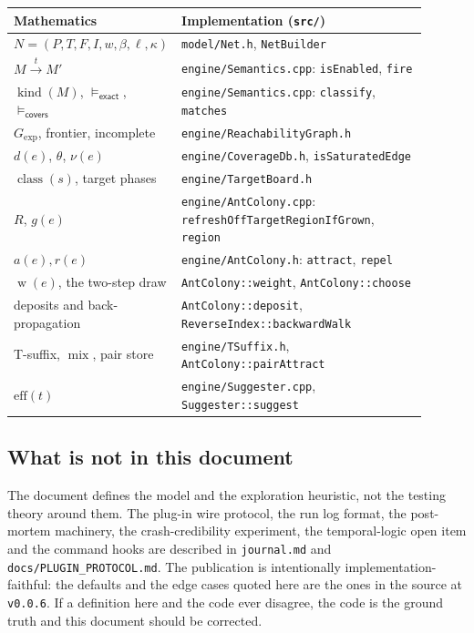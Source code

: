 \documentclass[11pt,a4paper]{article}
\newcommand{\Off}{R}
\newcommand{\kind}{\operatorname{kind}}
\newcommand{\cls}{\operatorname{class}}
\newcommand{\mix}{\operatorname{mix}}
\newcommand{\wgt}{\operatorname{w}}
\newcommand{\fir}[1]{\xrightarrow{#1}}
\begin{document}
\begin{center}
\small
\begin{tabular}{@{}p{0.28\linewidth}p{0.62\linewidth}@{}}
\toprule
Mathematics & Implementation (\texttt{src/}) \\
\midrule
$N=(P,T,F,I,w,\beta,\ell,\kappa)$ & \texttt{model/Net.h}, \texttt{NetBuilder} \\
$M\fir{t}M'$ & \texttt{engine/Semantics.cpp}: \texttt{isEnabled}, \texttt{fire} \\
$\kind(M)$, $\models_{\mathsf{exact}}$, $\models_{\mathsf{covers}}$ &
\texttt{engine/Semantics.cpp}: \texttt{classify}, \texttt{matches} \\
$G_{\mathrm{exp}}$, frontier, incomplete &
\texttt{engine/ReachabilityGraph.h} \\
$d(e)$, $\theta$, $\nu(e)$ & \texttt{engine/CoverageDb.h},
\texttt{isSaturatedEdge} \\
$\cls(s)$, target phases & \texttt{engine/TargetBoard.h} \\
$\Off$, $g(e)$ & \texttt{engine/AntColony.cpp}:
\texttt{refreshOffTargetRegionIfGrown}, \texttt{region} \\
$a(e),r(e)$ & \texttt{engine/AntColony.h}: \texttt{attract}, \texttt{repel} \\
$\wgt(e)$, the two-step draw & \texttt{AntColony::weight}, \texttt{AntColony::choose} \\
deposits and back-propagation & \texttt{AntColony::deposit},
\texttt{ReverseIndex::backwardWalk} \\
T-suffix, $\mix$, pair store & \texttt{engine/TSuffix.h},
\texttt{AntColony::pairAttract} \\
$\mathrm{eff}(t)$ & \texttt{engine/Suggester.cpp}, \texttt{Suggester::suggest} \\
\bottomrule
\end{tabular}
\end{center}

\subsection{What is not in this document}

The document defines the model and the exploration heuristic, not the testing
theory around them.  The plug-in wire protocol, the run log format, the
post-mortem machinery, the crash-credibility experiment, the temporal-logic
open item and the command hooks are described in \texttt{journal.md} and
\texttt{docs/PLUGIN\_PROTOCOL.md}.  The publication is intentionally
implementation-faithful: the defaults and the edge cases quoted here are the
ones in the source at \texttt{v0.0.6}.  If a definition here and the code ever
disagree, the code is the ground truth and this document should be corrected.
\end{document}
